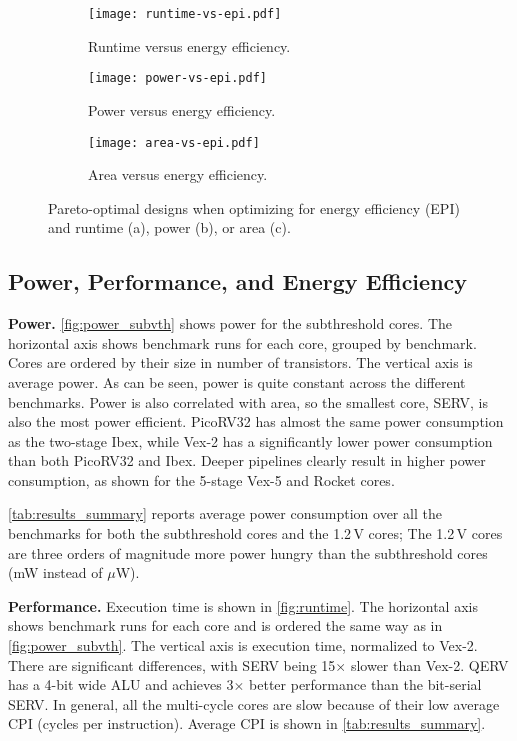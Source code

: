 \begin{figure*}[t]
  \centering
\begin{subfigure}{0.32\textwidth}
  \centering
  \texttt{[image: runtime-vs-epi.pdf]}
  \caption{Runtime versus energy efficiency.}
  \label{fig:runtim-vs-epi}
\end{subfigure}
\hfill
\begin{subfigure}{0.32\textwidth}
  \centering
  \texttt{[image: power-vs-epi.pdf]}
  \caption{Power versus energy efficiency.}
  \label{fig:power-vs-epi}
\end{subfigure}
\hfill
\begin{subfigure}{0.32\textwidth}
  \centering
  \texttt{[image: area-vs-epi.pdf]}
  \caption{Area versus energy efficiency.}
  \label{fig:area-vs-epi}
\end{subfigure}
  \caption{Pareto-optimal designs when optimizing for energy efficiency (EPI) and runtime (a), power (b), or area (c).}
  \label{fig:pareto}
\end{figure*}


\subsection{Power, Performance, and Energy Efficiency}
\label{subsec:power-perf-energy}

\noindent
\textbf{Power.}
\autoref{fig:power_subvth} shows power for the subthreshold cores.  The horizontal axis shows benchmark runs for each core, grouped by benchmark.  Cores are ordered by their size in number of transistors.  The vertical axis is average power.
As can be seen, power is quite constant across the different benchmarks.  Power is also correlated with area, so the smallest core, SERV, is also the most power efficient.
PicoRV32 has almost the same power consumption as the two-stage Ibex, while Vex-2 has a significantly lower power consumption than both PicoRV32 and Ibex.
Deeper pipelines clearly result in higher power consumption, as shown for the 5-stage Vex-5 and Rocket cores.

\autoref{tab:results_summary} reports average power consumption over all the benchmarks for both the subthreshold cores and the 1.2\,V cores; The 1.2\,V cores are three orders of magnitude more power hungry than the subthreshold cores (mW instead of $\mu$W).

\noindent
\textbf{Performance.}
Execution time is shown in \autoref{fig:runtime}.  The horizontal axis shows benchmark runs for each core and is ordered the same way as in \autoref{fig:power_subvth}.  The vertical axis is execution time, normalized to Vex-2.  
There are significant differences, with SERV being 15$\times$ slower than Vex-2.
QERV has a 4-bit wide ALU and achieves 3$\times$ better performance than the bit-serial SERV.
In general, all the multi-cycle cores are slow because of their low average CPI (cycles per instruction).
Average CPI is shown in \autoref{tab:results_summary}.

